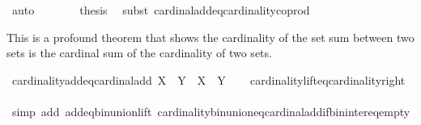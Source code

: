 \begin{isabellebody}
\ auto\isanewline
\ \ \ \ \isamarkupfalse%
\ \isamarkupfalse%
\ {\isacharquery}{\kern0pt}thesis\ \isamarkupfalse%
\ {\isacharparenleft}{\kern0pt}subst\ cardinal{\isacharunderscore}{\kern0pt}add{\isacharunderscore}{\kern0pt}eq{\isacharunderscore}{\kern0pt}cardinality{\isacharunderscore}{\kern0pt}coprod{\isacharparenright}{\kern0pt}\isanewline
\ \ \ \ \ \ \ \ \isamarkupfalse%
\isanewline
\ \ \ \ \ \ \isamarkupfalse%
%
\endisatagproof
{\isafoldproof}%
%
\isadelimproof
%
\endisadelimproof
%
\begin{isamarkuptext}%
This is a profound theorem that shows the cardinality of the set sum between two sets is 
the cardinal sum of the cardinality of two sets.%
\end{isamarkuptext}\isamarkuptrue%
\isamarkupfalse%
\ cardinality{\isacharunderscore}{\kern0pt}add{\isacharunderscore}{\kern0pt}eq{\isacharunderscore}{\kern0pt}cardinal{\isacharunderscore}{\kern0pt}add{\isacharcolon}{\kern0pt}\ {\isachardoublequoteopen}{\isacharbar}{\kern0pt}X\ {\isacharplus}{\kern0pt}\ Y{\isacharbar}{\kern0pt}\ {\isacharequal}{\kern0pt}\ {\isacharbar}{\kern0pt}X{\isacharbar}{\kern0pt}\ {\isasymoplus}\ {\isacharbar}{\kern0pt}Y{\isacharbar}{\kern0pt}{\isachardoublequoteclose}\isanewline
%
\isadelimproof
\ \ %
\endisadelimproof
%
\isatagproof
{}\isamarkupfalse%
\ cardinality{\isacharunderscore}{\kern0pt}lift{\isacharunderscore}{\kern0pt}eq{\isacharunderscore}{\kern0pt}cardinality{\isacharunderscore}{\kern0pt}right\isanewline
\ \ \isamarkupfalse%
\ {\isacharparenleft}{\kern0pt}simp\ add{\isacharcolon}{\kern0pt}\ add{\isacharunderscore}{\kern0pt}eq{\isacharunderscore}{\kern0pt}bin{\isacharunderscore}{\kern0pt}union{\isacharunderscore}{\kern0pt}lift\ cardinality{\isacharunderscore}{\kern0pt}bin{\isacharunderscore}{\kern0pt}union{\isacharunderscore}{\kern0pt}eq{\isacharunderscore}{\kern0pt}cardinal{\isacharunderscore}{\kern0pt}add{\isacharunderscore}{\kern0pt}if{\isacharunderscore}{\kern0pt}bin{\isacharunderscore}{\kern0pt}inter{\isacharunderscore}{\kern0pt}eq{\isacharunderscore}{\kern0pt}empty{\isacharparenright}{\kern0pt}%
\endisatagproof
{\isafoldproof}%
%
\isadelimproof
\isanewline
%
\endisadelimproof
%
\isadelimtheory
\isanewline
%
\endisadelimtheory
%
\isatagtheory
{}\isamarkupfalse%
%
\endisatagtheory
{\isafoldtheory}%
%
\isadelimtheory
%
\endisadelimtheory
%
\end{isabellebody}%
\endinput

